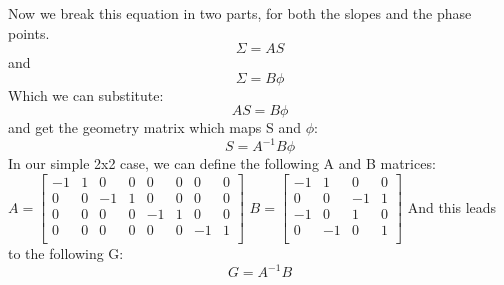 \documentclass{article}
\begin{document}
Now we break this equation in two parts, for both the slopes and the phase points.
$$ \varSigma = AS$$
and
$$ \varSigma = B\phi$$ 
Which we can substitute:
$$ AS = B\phi $$
and get the geometry matrix which maps S and $\phi$:
$$ S = A^{-1}B\phi $$
In our simple 2x2 case, we can define the following A and B matrices:
\newline
\newline
$ A=
\begin{bmatrix}
-1 & 1 & 0 & 0 & 0 & 0 & 0 & 0  \\
 0 & 0 & -1& 1 & 0 & 0 & 0 & 0  \\
 0 & 0 & 0 & 0 & -1& 1 & 0 & 0  \\
 0 & 0 & 0 & 0 & 0 & 0 & -1& 1  \\
\end{bmatrix}
$
$
B = 
\begin{bmatrix}
-1 & 1 & 0 & 0 \\
 0 & 0 & -1& 1 \\
-1 & 0 & 1 & 0 \\
 0 & -1& 0 & 1 \\
\end{bmatrix}
$
\newline
\newline
And this leads to the following G:
$$
G = A^{-1}B 
$$

\newpage
\end{document}
